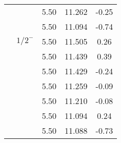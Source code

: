 \documentclass[prd,twocolumn,floatfix,nofootinbib]{revtex4}
\begin{document}
\begin{table*}[!htbp]
\begin{tabular}{ccccc}
            &               &5.50   &11.262 &-0.25  \\
            &               &5.50   &11.094 &-0.74  \\
            &${1/2}^{-}$    &5.50   &11.505 &0.26  \\
            &               &5.50   &11.439 &0.39  \\
            &               &5.50   &11.429 &-0.24  \\
            &               &5.50   &11.259 &-0.09  \\
            &               &5.50   &11.210 &-0.08  \\
            &               &5.50   &11.094 &0.24  \\
            &               &5.50   &11.088 &-0.73  \\
        \hline\hline
    \end{tabular}
\end{table*}
\end{document}
